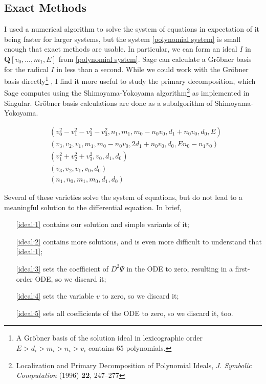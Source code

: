 \documentclass{article}
\begin{document}
\subsection*{Exact Methods}

I used a numerical algorithm to solve the system of equations in expectation
of it being faster for larger systems, but the system \eqref{polynomial system}
is small enough that exact methods are usable.  In particular, we can form
an ideal $I$ in $\mathbf{Q}[v_0,...,m_1,E]$ from \eqref{polynomial system}.
Sage can calculate a Gr\"obner basis for the radical $I$ in less than a second.
While we could work with the Gr\"obner basis directly\footnote{A Gr\"obner basis
of the solution ideal in lexicographic order $E>d_i>m_i>n_i>v_i$ contains 65 polynomials.}
, I find it more
useful to study the primary decomposition, which Sage computes using
the Shimoyama-Yokoyama algorithm\footnote{Localization and Primary Decomposition of
Polynomial Ideals, {\it J. Symbolic Computation} (1996) {\bf 22}, 247–277}
as implemented in Singular.  Gr\"obner basis calculations are done
as a subalgorithm of Shimoyama-Yokoyama.

\begin{subequations}
\begin{align}
& \left(v_{0}^{2} - v_{1}^{2} - v_{2}^{2} - v_{3}^{2}, n_{1}, m_{1}, m_{0} - n_{0} v_{0}, d_{1} + n_{0} v_{0}, d_{0}, E\right)\label{ideal:1} \\
& \left(v_{3}, v_{2}, v_{1}, m_{1}, m_{0} - n_{0} v_{0}, 2 d_{1} + n_{0} v_{0}, d_{0}, E n_{0} - n_{1} v_{0}\right)\label{ideal:2}\\
& \left(v_{1}^{2} + v_{2}^{2} + v_{3}^{2}, v_{0}, d_{1}, d_{0}\right)\label{ideal:3}\\
& \left(v_{3}, v_{2}, v_{1}, v_{0}, d_{0}\right)\label{ideal:4}\\
& \left(n_{1}, n_{0}, m_{1}, m_{0}, d_{1}, d_{0}\right)\label{ideal:5}
\end{align}
\end{subequations}

Several of these varieties solve the system of equations, but do not lead to a meaningful solution to the differential equation.
In brief,

\begin{itemize}
\item[\eqref{ideal:1}] contains our solution and simple variants of it;
\item[\eqref{ideal:2}] contains more solutions, and is even more difficult to understand that \eqref{ideal:1};
\item[\eqref{ideal:3}] sets the coefficient of
$D^2\Psi$
in the ODE to zero, resulting in a first-order ODE, so we discard it;
\item[\eqref{ideal:4}] sets the variable $v$ to zero, so we discard it;
\item[\eqref{ideal:5}] sets all coefficients of the ODE to zero, so we discard it, too.

\end{itemize}
\end{document}
